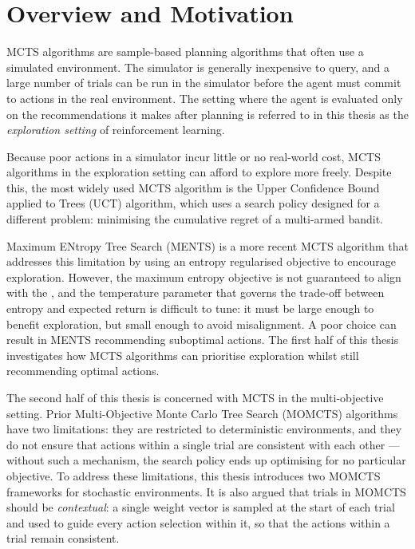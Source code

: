 \section{Overview and Motivation}
\label{sec:1-1-overview}

    MCTS algorithms are sample-based planning algorithms that often use a simulated environment. The simulator is generally inexpensive to query, and a large number of trials can be run in the simulator before the agent must commit to actions in the real environment. The setting where the agent is evaluated only on the recommendations it makes after planning is referred to in this thesis as the \textit{exploration setting} of reinforcement learning. 

    Because poor actions in a simulator incur little or no real-world cost, MCTS algorithms in the exploration setting can afford to explore more freely. Despite this, the most widely used MCTS algorithm is the Upper Confidence Bound applied to Trees (UCT) algorithm, which uses a search policy designed for a different problem: minimising the cumulative regret of a multi-armed bandit. 

    Maximum ENtropy Tree Search (MENTS) is a more recent MCTS algorithm that addresses this limitation by using an entropy regularised objective to encourage exploration. However, the maximum entropy objective is not guaranteed to align with the , and the temperature parameter that governs the trade-off between entropy and expected return is difficult to tune: it must be large enough to benefit exploration, but small enough to avoid misalignment. A poor choice can result in MENTS recommending suboptimal actions. The first half of this thesis investigates how MCTS algorithms can prioritise exploration whilst still recommending optimal actions.

    The second half of this thesis is concerned with MCTS in the multi-objective setting. Prior Multi-Objective Monte Carlo Tree Search (MOMCTS) algorithms have two limitations: they are restricted to deterministic environments, and they do not ensure that actions within a single trial are consistent with each other --- without such a mechanism, the search policy ends up optimising for no particular objective. To address these limitations, this thesis introduces two MOMCTS frameworks for stochastic environments. It is also argued that trials in MOMCTS should be \textit{contextual}: a single weight vector is sampled at the start of each trial and used to guide every action selection within it, so that the actions within a trial remain consistent.



